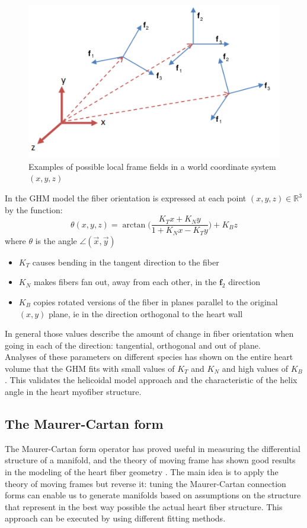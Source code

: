 \begin{figure}[h!]
    \centering
    \includegraphics[width=.5\textwidth]{figures/frame_fields}
    \caption{Examples of possible local frame fields in a world coordinate system $(x, y, z)$}
    \label{fig:frame_fields}
\end{figure}

In the GHM model the fiber orientation is expressed at each point $(x, y, z) \in \mathbb{R}^3$ by the function:
\begin{equation}
\theta (x, y, z) = \arctan \Bigg( \frac{K_Tx + K_Ny}{1 + K_Nx - K_Ty} \Bigg) + K_Bz
\end{equation}
where $\theta$ is the angle $\angle (\overrightarrow{x}, \overrightarrow{y})$
\begin{itemize}
    \item $K_T$ causes bending in the tangent direction to the fiber
    \item $K_N$ makes fibers fan out, away from each other, in the $\mathbf{f}_2$ direction
    \item $K_B$ copies rotated versions of the fiber in planes parallel to the original $(x, y)$ plane, ie in the direction orthogonal to the heart wall
\end{itemize}
In general those values describe the amount of change in fiber orientation when going in each of the direction: tangential, orthogonal and out of plane.\\
Analyses of these parameters on different species has shown on the entire heart volume \cite{savadjiev2012heart} that the GHM fits with small values of $K_T$ and $K_N$ and high values of $K_B$. This validates the helicoidal model approach and the characteristic of the helix angle in the heart myofiber structure.

\subsection{The Maurer-Cartan form}

The Maurer-Cartan form operator has proved useful in measuring the differential structure of a manifold, and the theory of moving frame has shown good results in the modeling of the heart fiber geometry \cite{pami2015}. The main idea is to apply the theory of moving frames but reverse it: tuning the Maurer-Cartan connection forms can enable us to generate manifolds based on assumptions on the structure that represent in the best way possible the actual heart fiber structure. This approach can be executed by using different fitting methods.

